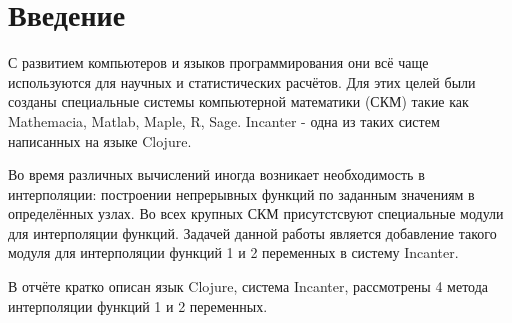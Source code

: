 
\section{Введение}

С развитием компьютеров и языков программирования они всё чаще используются для научных и статистических расчётов. Для этих целей были созданы специальные системы компьютерной математики (СКМ) такие как Mathemacia, Matlab, Maple, R, Sage. Incanter - одна из таких систем написанных на языке Clojure.

Во время различных вычислений иногда возникает необходимость в интерполяции: построении непрерывных функций по заданным значениям в определённых узлах. Во всех крупных СКМ присутстсвуют специальные модули для интерполяции функций. Задачей данной работы является добавление такого модуля для интерполяции функций 1 и 2 переменных в систему Incanter.

В отчёте кратко описан язык Clojure, система Incanter, рассмотрены 4 метода интерполяции функций 1 и 2 переменных.

